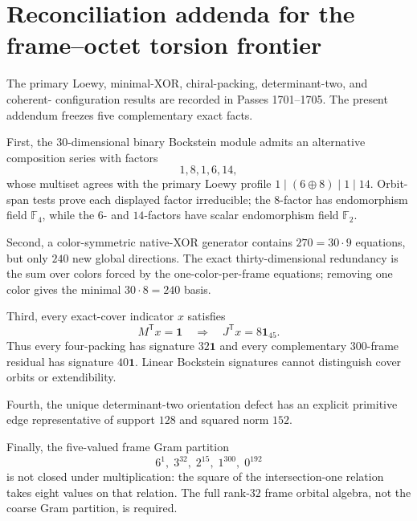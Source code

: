 \section{Reconciliation addenda for the frame--octet torsion frontier}
\label{sec:bt1806-1810}

The primary Loewy, minimal-XOR, chiral-packing, determinant-two, and coherent-
configuration results are recorded in Passes 1701--1705.  The present addendum
freezes five complementary exact facts.

First, the $30$-dimensional binary Bockstein module admits an alternative
composition series with factors
\[
1,8,1,6,14,
\]
whose multiset agrees with the primary Loewy profile
$1\mid(6\oplus8)\mid1\mid14$.  Orbit-span tests prove each displayed factor
irreducible; the $8$-factor has endomorphism field $\mathbb F_4$, while the
$6$- and $14$-factors have scalar endomorphism field $\mathbb F_2$.

Second, a color-symmetric native-XOR generator contains $270=30\cdot9$
equations, but only $240$ new global directions.  The exact thirty-dimensional
redundancy is the sum over colors forced by the one-color-per-frame equations;
removing one color gives the minimal $30\cdot8=240$ basis.

Third, every exact-cover indicator $x$ satisfies
\[
M^{\mathsf T}x=\mathbf1
\quad\Longrightarrow\quad
J^{\mathsf T}x=8\mathbf1_{45}.
\]
Thus every four-packing has signature $32\mathbf1$ and every complementary
$300$-frame residual has signature $40\mathbf1$.  Linear Bockstein signatures
cannot distinguish cover orbits or extendibility.

Fourth, the unique determinant-two orientation defect has an explicit primitive
edge representative of support $128$ and squared norm $152$.

Finally, the five-valued frame Gram partition
\[
6^1,\;3^{32},\;2^{15},\;1^{300},\;0^{192}
\]
is not closed under multiplication: the square of the intersection-one relation
takes eight values on that relation.  The full rank-$32$ frame orbital algebra,
not the coarse Gram partition, is required.
